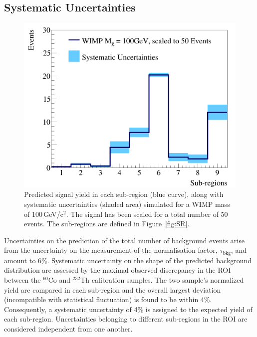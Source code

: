 


\subsection{Systematic Uncertainties}

\begin{figure}[t!]
  \includegraphics[width=\linewidth]{wimp_sys_unc.png}
  \caption{Predicted signal yield in each sub-region (blue curve), along with systematic uncertainties (shaded area) simulated for a WIMP mass of 100\,GeV/c$^2$.  The signal has been scaled for a total number of 50 events. The sub-regions are defined in Figure~\ref{fig:SR}.}
  \label{fig:unc}
\end{figure}


Uncertainties on the  prediction of the total number of background events arise from the uncertainty on the measurement of the normalisation 
factor, $\tau_{\text{bkg}}$, and amount to 6\%. %
Systematic uncertainty on the shape of the predicted background distribution are assessed by the maximal observed discrepancy in the ROI between
the $^{60}$Co and $^{232}$Th calibration samples. The two sample's normalized yield are compared in each sub-region and the overall largest deviation (incompatible
with statistical fluctuation) is found to be within 4\%.  Consequently, a systematic uncertainty of 4\% is assigned  to the expected yield of each sub-region.
Uncertainties belonging to different sub-regions in the ROI are considered independent from one another.

